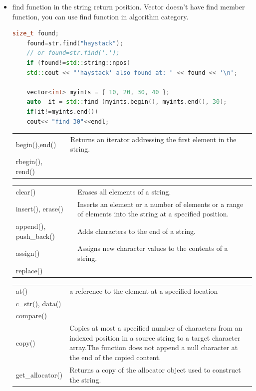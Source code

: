 \documentclass[a4paper,11pt,twoside]{book}
\renewcommand{\hline}{}
\begin{document}
\begin{itemize}
	\item find function in the string return position. Vector doesn't have find member function, you can use find function in  algorithm category.
	
	\begin{lstlisting}[frame=single, language=c++]
	size_t found;
	found=str.find("haystack");
	// or found=str.find('.');
	if (found!=std::string::npos)
	std::cout << "'haystack' also found at: " << found << '\n';
	
	vector<int> myints = { 10, 20, 30, 40 };
	auto  it = std::find (myints.begin(), myints.end(), 30);
	if(it!=myints.end())
	cout<< "find 30"<<endl;
	\end{lstlisting}
	
	
	\begin{tabular}{| p{} |p{}|}
		\hline
		begin(),end() & Returns an iterator addressing the first element in the string.\\
		\hline
		rbegin(), rend() & \\
		\hline
		
	\end{tabular}
	
	
	\begin{tabular}{| p{} |p{}|}
		\hline
		clear()& Erases all elements of a string.\\
		\hline
		insert(), erase() & Inserts an element or a number of elements or a range of elements into the string at a specified position.\\
		\hline
		append(), push\_back() & Adds characters to the end of a string.\\
		\hline
		assign() &Assigns new character values to the contents of a string.\\
		\hline
		replace() & \\
		\hline
	\end{tabular}
	
	\begin{tabular}{| p{} |p{}|}
		
		\hline
		at() & a reference to the element at a specified location \\
		\hline
		c\_str(), data() & \\
		\hline
		compare()& \\
		\hline
		copy() & Copies at most a specified number of characters from an indexed position in a source string to a target character array.The function does not append a null character at the end of the copied content.
		\\
		\hline
		get\_allocator() & Returns a copy of the allocator object used to construct the string.\\
		\hline
		

\end{tabular}
\end{itemize}
\end{document}
